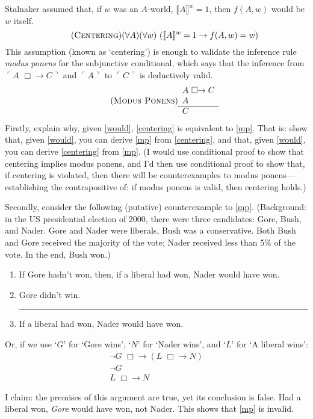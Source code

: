 \documentclass[10pt,leqno]{article}
\newcommand{\p}{\item}
\newcommand{\e}{\emph}
\newcommand{\argu}[2]{\begin{center}
\begin{minipage}{#1}
	\begin{enumerate}
	#2
	\end{enumerate}
\end{minipage}
\end{center}}
\newcommand{\s}{\textsc}
\newcommand{\qq}[1]{\ulcorner #1 \urcorner}
\newcommand{\would}{ \,\,\Box\!\!\to }
\newcommand{\V}[1]{\llbracket #1 \rrbracket}
\newcommand{\thus}{

\vspace{5pt}\hrule

}
\begin{document}
	Stalnaker assumed that, if $w$ was an $A$-world, $\V{A}^w = 1$, then $f(A, w)$ would be $w$ itself.  
		\[\tag{\s{Centering}}\label{centering}
		(\forall A) (\forall w) \,\,(\V{A}^w = 1 \to f(A, w) = w )
		\]	
	This assumption (known as `centering') is enough to validate the inference rule \e{modus ponens} for the subjunctive conditional, which says that the inference from $\qq{A \would C}$ and $\qq{A}$ to  $\qq{C}$ is deductively valid.
		\[\tag{\s{Modus Ponens}}\label{mp}
			\begin{array}{l}
			A \would C	\\
			A						\\\hline
			C
			\end{array}
		\]
	Firstly, explain why, given \eqref{would}, \ref{centering} is equivalent to \ref{mp}.  That is: show that, given \ref{would}, you can derive  \ref{mp} from \ref{centering}, and that, given \eqref{would}, you can derive \ref{centering} from \ref{mp}.  (I would use conditional proof to show that centering implies modus ponens, and I'd then use conditional proof to show that, if centering is violated, then there will be counterexamples to modus ponens---establishing the contrapositive of: if modus ponens is valid, then centering holds.)
	
	
	
	Secondly, consider the following (putative) counterexample to \eqref{mp}.  (Background: in the US presidential election of 2000, there were three candidates: Gore, Bush, and Nader.  Gore and Nader were liberals, Bush was a conservative.  Both Bush and Gore received the majority of the vote; Nader received less than 5\% of the vote.  In the end, Bush won.)
		\argu{200pt}{
		\p[] If Gore hadn't won, then, if a liberal had won, Nader would have won.
		\p[] Gore didn't win.
		\thus
		\p[] If a liberal had won, Nader would have won.
		}
	Or, if we use `$G$' for `Gore wins', `$N$' for `Nader wins', and `$L$' for `A liberal wins':
		\[\begin{array}{l}
		\neg G \would (L \would N)	\\
		\neg G										\\\hline
		L \would N
		\end{array}
		\]
	
	I claim: the premises of this argument are true, yet its conclusion is false.  Had a liberal won, \e{Gore} would have won, not Nader.  This shows that \ref{mp} is invalid.
	
\end{document}
